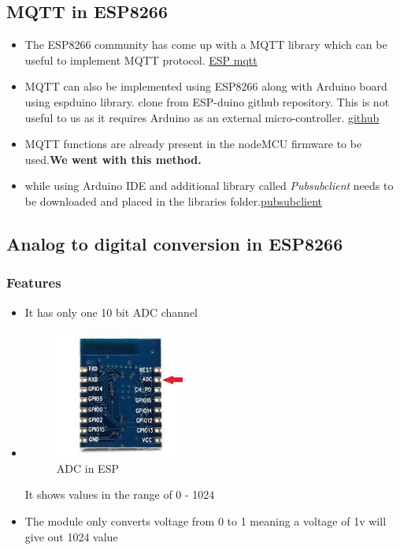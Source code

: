 \documentclass[16pt]{article}
\begin{document}
\vspace{0.5cm}

\subsection{MQTT in ESP8266}

\begin{itemize}

\item
  The ESP8266 community has come up with a MQTT library which can be
  useful to implement MQTT protocol. {\color{red}\href{https://github.com/tuanpmt/esp_mqtt}{ESP mqtt}}
 
\item
  MQTT can also be implemented using ESP8266 along with Arduino board
  using espduino library. clone from ESP-duino github repository. This is not
  useful to us as it requires Arduino as an external micro-controller. {\color{red}\href{https://github.com/tuanpmt/espduino}{github}}
\item
  MQTT functions are already present in the nodeMCU firmware to be used.\textbf{We went with this method.}
\item
  while using Arduino IDE and additional library called
  \emph{Pubsubclient} needs to be downloaded and placed in the libraries
  folder.{\color{red}\href{https://github.com/Imroy/pubsubclient}{pubsubclient}}
\end{itemize}



\subsection{Analog to digital conversion in
ESP8266}

\subsubsection{Features}
\begin{itemize}
\item
  It has only one 10 bit ADC channel
\item

\begin{figure}
\hspace{3cm}
\includegraphics[width=0.4\textwidth]{images/ADC.jpeg}
\caption{ADC in ESP}
\end{figure}
  It shows values in the range of 0 - 1024
\item
  The module only converts voltage from 0 to 1 meaning a voltage of 1v
  will give out 1024 value
\end{itemize}
\end{document}
